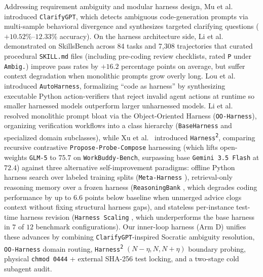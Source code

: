 \documentclass[11pt,a4paper,copyright]{google}
\begin{document}
Addressing requirement ambiguity and modular harness design, Mu et al.\ \cite{mu2024clarifygpt} introduced \texttt{ClarifyGPT}, which detects ambiguous code-generation prompts via multi-sample behavioral divergence and synthesizes targeted clarifying questions ($+10.52\%$--$12.33\%$ accuracy). On the harness architecture side, Li et al.\ \cite{skillsbench2026} demonstrated on SkillsBench across 84 tasks and 7,308 trajectories that curated procedural \texttt{SKILL.md} files (including pre-coding review checklists, rated \texttt{P} under \texttt{Ambig.}) improve pass rates by $+16.2$ percentage points on average, but suffer context degradation when monolithic prompts grow overly long. Lou et al.\ \cite{lou2026autoharness} introduced \texttt{AutoHarness}, formalizing ``code as harness'' by synthesizing executable Python action-verifiers that reject invalid agent actions at runtime so smaller harnessed models outperform larger unharnessed models. Li et al.\ \cite{li2026ooharness} resolved monolithic prompt bloat via the Object-Oriented Harness (\texttt{OO-Harness}), organizing verification workflows into a class hierarchy (\texttt{BaseHarness} and specialized domain subclasses), while Xu et al.\ \cite{xu2026harness2} introduced \texttt{Harness\textsuperscript{2}}, comparing recursive contrastive \texttt{Propose-Probe-Compose} harnessing (which lifts open-weights \texttt{GLM-5} to $75.7$ on \texttt{WorkBuddy-Bench}, surpassing base \texttt{Gemini 3.5 Flash} at $72.4$) against three alternative self-improvement paradigms: offline Python harness search over labeled training splits (\texttt{Meta-Harness} \cite{lee2026metaharness}), retrieval-only reasoning memory over a frozen harness (\texttt{ReasoningBank} \cite{ouyang2025reasoningbank}, which degrades coding performance by up to $6.6$ points below baseline when unmerged advice clogs context without fixing structural harness gaps), and stateless per-instance test-time harness revision (\texttt{Harness Scaling} \cite{wang2026rethinking}, which underperforms the base harness in $7$ of $12$ benchmark configurations). Our inner-loop harness (Arm D) unifies these advances by combining \texttt{ClarifyGPT}-inspired Socratic ambiguity resolution, \texttt{OO-Harness} domain routing, \texttt{Harness\textsuperscript{2}} $(N-\eta, N, N+\eta)$ boundary probing, physical \texttt{chmod 0444} + external SHA-256 test locking, and a two-stage cold subagent audit.
\end{document}
